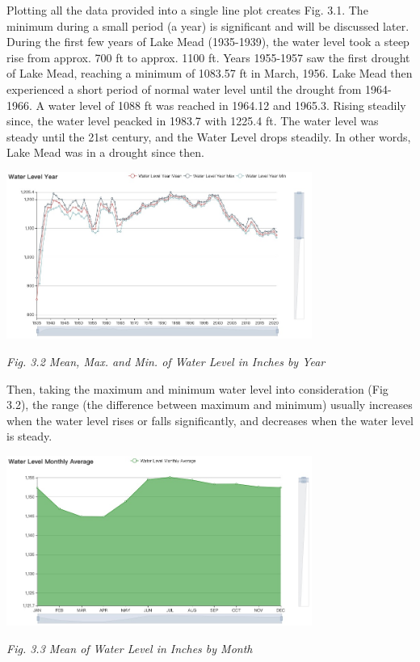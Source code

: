 \documentclass[12pt]{article}
\theoremstyle{definition}
\theoremstyle{remark}
\numberwithin{equation}{section}
\begin{document}
		Plotting all the data provided into a single line plot creates Fig. 3.1. The minimum during a small period (a year) is significant and will be discussed later. During the first few years of Lake Mead (1935-1939), the water level took a steep rise from approx. 700 ft to approx. 1100 ft. Years 1955-1957 saw the first drought of Lake Mead, reaching a minimum of 1083.57 ft in March, 1956. Lake Mead then experienced a short period of normal water level until the drought from 1964-1966. A water level of 1088 ft was reached in 1964.12 and 1965.3. Rising steadily since, the water level peacked in 1983.7 with 1225.4 ft. The water level was steady until the 21st century, and the Water Level drops steadily. In other words, Lake Mead was in a drought since then.
		
		\begin{center}
		\includegraphics[width=10cm]{3.2 Mean, Max. and Min. of Water Level in Inches by Year.jpg}

		\small \textit{Fig. 3.2 Mean, Max. and Min. of Water Level in Inches by Year}
		\end{center}
		
		Then, taking the maximum and minimum water level into consideration (Fig 3.2), the range (the difference
		between maximum and minimum) usually increases when the water level rises or falls significantly, and 
		decreases when the water level is steady.
		
		\begin{center}
		\includegraphics[width=10cm]{3.3 Mean of Water Level in Inches by Month.jpg}

		\small \textit{Fig. 3.3 Mean of Water Level in Inches by Month}
		\end{center}
		
\end{document}
